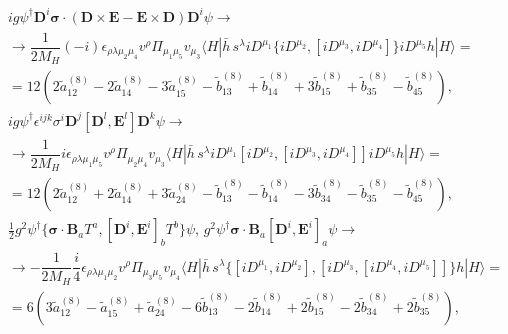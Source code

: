 \vspace{-0.5cm}
\begin{eqnarray}\label{eqn:chap4_dim8_SD_NRQED_op}
&&ig \psi^\dagger  \bm{D}^i \bm{\sigma}\cdot ( \bm{D}\times\bm{E} - \bm{E}\times\bm{D} )\bm{D}^i\psi\to\nonumber\\
&&\to  \dfrac1{2M_H}(-i)\epsilon_{\rho\lambda\mu_2\mu_4}v^\rho \Pi_{\mu_1\mu_5}v_{\mu_3}\langle H |\bar h\,s^\lambda iD^{\mu_1}\{iD^{\mu_2},[iD^{\mu_3},iD^{\mu_4}]\} iD^{\mu_5}h|H\rangle=\nonumber\\
&&=12 \left(2 \tilde{a}_{12}^{(8)}- 2 \tilde{a}_{14}^{(8)}- 3 \tilde{a}_{15}^{(8)} - \tilde{b}_{13}^{(8)} + \tilde{b}_{14}^{(8)} + 3 \tilde{b}_{15}^{(8)} + \tilde{b}_{35}^{(8)} - \tilde{b}_{45}^{(8)}\right),\nonumber\\
%
&&ig \psi^\dagger  \epsilon^{ijk} \sigma^i \bm{D}^j [\bm{D}^l,\bm{E}^l] \bm{D}^k\psi\to\nonumber\\
&&\to  \dfrac1{2M_H}i\epsilon_{\rho\lambda\mu_1\mu_5}v^\rho \Pi_{\mu_2\mu_4}v_{\mu_3}\langle H |\bar h\,s^\lambda iD^{\mu_1}[iD^{\mu_2},[iD^{\mu_3},iD^{\mu_4}]] iD^{\mu_5}h|H\rangle=\nonumber\\
&&=12\left(2 \tilde{a}_{12}^{(8)}+ 2 \tilde{a}_{14}^{(8)}+ 3 \tilde{a}_{24}^{(8)}- \tilde{b}_{13}^{(8)}- \tilde{b}_{14}^{(8)}- 3 \tilde{b}_{34}^{(8)}- \tilde{b}_{35}^{(8)}- \tilde{b}_{45}^{(8)}\right),\nonumber\\
&&\frac12g^2\psi^\dagger\{\bm{\sigma}\cdot\bm{B}_aT^a, [\bm{D}^i,\bm{E}^i]_bT^b\}\psi,\, g^2\psi^\dagger\bm{\sigma}\cdot\bm{B}_a [\bm{D}^i,\bm{E}^i]_a\psi\to\nonumber\\
&&\to  -\dfrac1{2M_H}\dfrac{i}4\epsilon_{\rho\lambda\mu_1\mu_2}v^\rho \Pi_{\mu_3\mu_5}v_{\mu_4}\langle H |\bar h\,s^\lambda \{[iD^{\mu_1},iD^{\mu_2}],[iD^{\mu_3},[iD^{\mu_4},iD^{\mu_5}]]\}h|H\rangle=\nonumber\\
&&=6\left(3 \tilde{a}_{12}^{(8)}-  \tilde{a}_{15}^{(8)}+ \tilde{a}_{24}^{(8)}-6 \tilde{b}_{13}^{(8)}- 2\tilde{b}_{14}^{(8)}+ 2\tilde{b}_{15}^{(8)}-2\tilde{b}_{34}^{(8)}+2\tilde{b}_{35}^{(8)}\right),\nonumber
\end{eqnarray}
